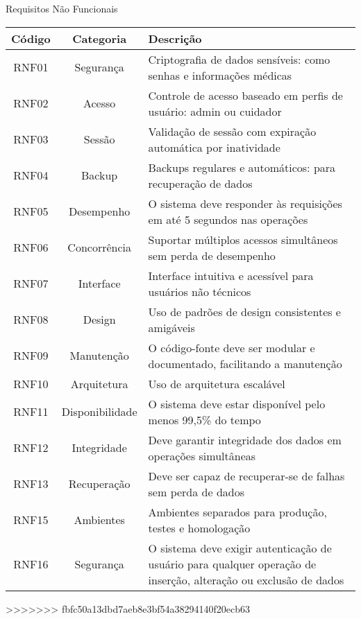 \begin{quadro}
    \caption{\label{quadro_requisitos_nf}Requisitos Não Funcionais}
    \begin{tabular}{|c|c|p{10cm}|}
        \hline
        \textbf{Código} & \textbf{Categoria} & \textbf{Descrição} \\ \hline
        RNF01  & Segurança       & Criptografia de dados sensíveis: como senhas e informações médicas \\ \hline
        RNF02  & Acesso          & Controle de acesso baseado em perfis de usuário: admin ou cuidador \\ \hline
        RNF03  & Sessão          & Validação de sessão com expiração automática por inatividade \\ \hline
        RNF04  & Backup          & Backups regulares e automáticos: para recuperação de dados \\ \hline
        RNF05  & Desempenho      & O sistema deve responder às requisições em até 5 segundos nas operações \\ \hline
        RNF06  & Concorrência    & Suportar múltiplos acessos simultâneos sem perda de desempenho \\ \hline
        RNF07  & Interface       & Interface intuitiva e acessível para usuários não técnicos \\ \hline
        RNF08  & Design          & Uso de padrões de design consistentes e amigáveis \\ \hline
        RNF09  & Manutenção      & O código-fonte deve ser modular e documentado, facilitando a manutenção \\ \hline
        RNF10  & Arquitetura     & Uso de arquitetura escalável \\ \hline
        RNF11  & Disponibilidade & O sistema deve estar disponível pelo menos 99,5\% do tempo \\ \hline
        RNF12  & Integridade     & Deve garantir integridade dos dados em operações simultâneas \\ \hline
        RNF13  & Recuperação     & Deve ser capaz de recuperar-se de falhas sem perda de dados \\ \hline
        RNF15  & Ambientes       & Ambientes separados para produção, testes e homologação \\ \hline
        RNF16  & Segurança       & O sistema deve exigir autenticação de usuário para qualquer operação de inserção, alteração ou exclusão de dados \\ \hline
    \end{tabular}
\end{quadro}
>>>>>>> fbfc50a13dbd7aeb8e3bf54a38294140f20ecb63
